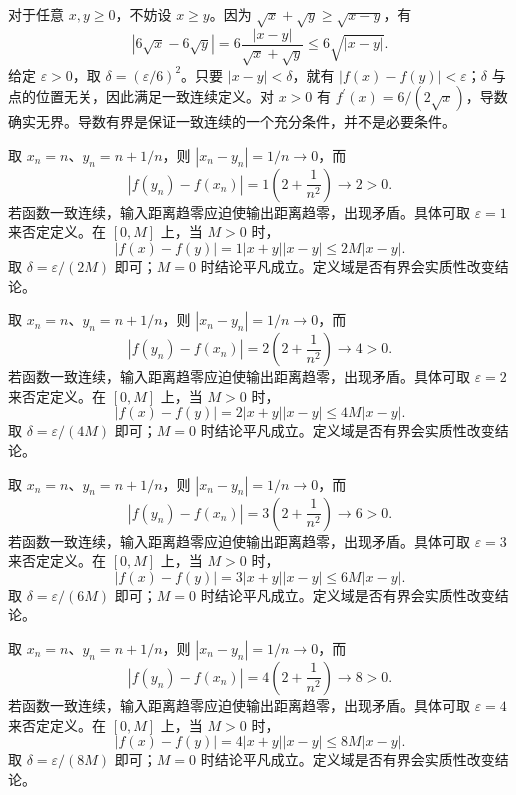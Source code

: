 \documentclass[UTF8,12pt,a4paper,fontset=fandol]{ctexart}
\begin{document}
\begin{solve}\label{ans:c6q18}
对于任意 $x,y\ge0$，不妨设 $x\ge y$。因为 $\sqrt x+\sqrt y\ge\sqrt{x-y}$，有
\[
|6\sqrt x-6\sqrt y|=6\frac{|x-y|}{\sqrt x+\sqrt y}\le 6\sqrt{|x-y|}.
\]
给定 $\varepsilon>0$，取 $\delta=(\varepsilon/6)^2$。只要 $|x-y|<\delta$，就有 $|f(x)-f(y)|<\varepsilon$；$\delta$ 与点的位置无关，因此满足一致连续定义。对 $x>0$ 有 $f^{\prime}(x)=6/(2\sqrt x)$，导数确实无界。导数有界是保证一致连续的一个充分条件，并不是必要条件。
\end{solve}

\begin{solve}\label{ans:c6q19}
取 $x_n=n$、$y_n=n+1/n$，则 $|x_n-y_n|=1/n\to0$，而
\[
|f(y_n)-f(x_n)|=1\left(2+\frac1{n^2}\right)\longrightarrow 2>0.
\]
若函数一致连续，输入距离趋零应迫使输出距离趋零，出现矛盾。具体可取 $\varepsilon=1$ 来否定定义。在 $[0,M]$ 上，当 $M>0$ 时，
\[
|f(x)-f(y)|=1|x+y||x-y|\le 2M|x-y|.
\]
取 $\delta=\varepsilon/(2M)$ 即可；$M=0$ 时结论平凡成立。定义域是否有界会实质性改变结论。
\end{solve}

\begin{solve}\label{ans:c6q20}
取 $x_n=n$、$y_n=n+1/n$，则 $|x_n-y_n|=1/n\to0$，而
\[
|f(y_n)-f(x_n)|=2\left(2+\frac1{n^2}\right)\longrightarrow 4>0.
\]
若函数一致连续，输入距离趋零应迫使输出距离趋零，出现矛盾。具体可取 $\varepsilon=2$ 来否定定义。在 $[0,M]$ 上，当 $M>0$ 时，
\[
|f(x)-f(y)|=2|x+y||x-y|\le 4M|x-y|.
\]
取 $\delta=\varepsilon/(4M)$ 即可；$M=0$ 时结论平凡成立。定义域是否有界会实质性改变结论。
\end{solve}

\begin{solve}\label{ans:c6q21}
取 $x_n=n$、$y_n=n+1/n$，则 $|x_n-y_n|=1/n\to0$，而
\[
|f(y_n)-f(x_n)|=3\left(2+\frac1{n^2}\right)\longrightarrow 6>0.
\]
若函数一致连续，输入距离趋零应迫使输出距离趋零，出现矛盾。具体可取 $\varepsilon=3$ 来否定定义。在 $[0,M]$ 上，当 $M>0$ 时，
\[
|f(x)-f(y)|=3|x+y||x-y|\le 6M|x-y|.
\]
取 $\delta=\varepsilon/(6M)$ 即可；$M=0$ 时结论平凡成立。定义域是否有界会实质性改变结论。
\end{solve}

\begin{solve}\label{ans:c6q22}
取 $x_n=n$、$y_n=n+1/n$，则 $|x_n-y_n|=1/n\to0$，而
\[
|f(y_n)-f(x_n)|=4\left(2+\frac1{n^2}\right)\longrightarrow 8>0.
\]
若函数一致连续，输入距离趋零应迫使输出距离趋零，出现矛盾。具体可取 $\varepsilon=4$ 来否定定义。在 $[0,M]$ 上，当 $M>0$ 时，
\[
|f(x)-f(y)|=4|x+y||x-y|\le 8M|x-y|.
\]
取 $\delta=\varepsilon/(8M)$ 即可；$M=0$ 时结论平凡成立。定义域是否有界会实质性改变结论。
\end{solve}
\end{document}
